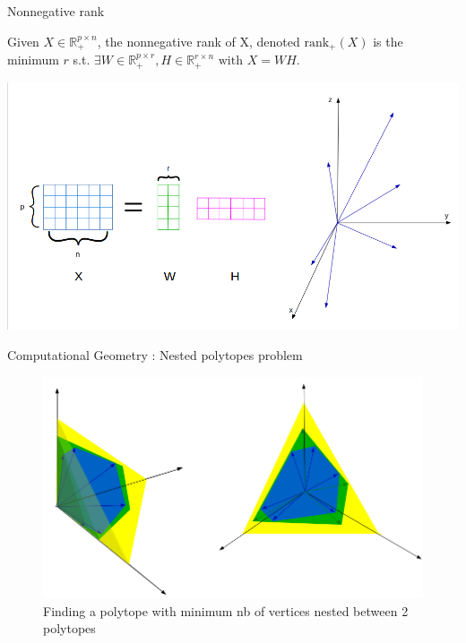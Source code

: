 \begin{frame}{Nonnegative rank}
\begin{defn}
Given $X \in \mathbb{R}_+^{p\times n}$, the nonnegative rank of X, denoted $\text{rank}_+(X)$ is the minimum $r$ s.t. $\exists W \in \mathbb{R}_+^{p\times r}, H \in \mathbb{R}_+^{r\times n} \text{ with } X = WH$.
\end{defn}
\centering
\includegraphics[scale=0.28]{../images/NMFvect.png}
\end{frame}
\begin{frame}{Computational Geometry : Nested polytopes problem}
\begin{figure}
\centering
\includegraphics[scale=0.35]{../images/polytopeGeo.png}
\caption{\footnotesize Finding a polytope with minimum nb of vertices nested between 2 polytopes}
\end{figure}
\end{frame}

